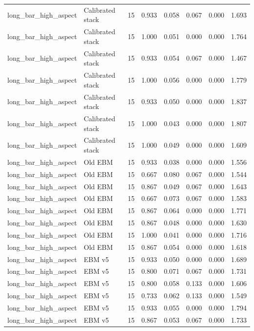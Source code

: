 {\begin{longtable}{llrrrrrr}
long\_bar\_high\_aspect & Calibrated stack & 15 & 0.933 & 0.058 & 0.067 & 0.000 & 1.693 \\
long\_bar\_high\_aspect & Calibrated stack & 15 & 1.000 & 0.051 & 0.000 & 0.000 & 1.764 \\
long\_bar\_high\_aspect & Calibrated stack & 15 & 0.933 & 0.054 & 0.067 & 0.000 & 1.467 \\
long\_bar\_high\_aspect & Calibrated stack & 15 & 1.000 & 0.056 & 0.000 & 0.000 & 1.779 \\
long\_bar\_high\_aspect & Calibrated stack & 15 & 0.933 & 0.050 & 0.000 & 0.000 & 1.837 \\
long\_bar\_high\_aspect & Calibrated stack & 15 & 1.000 & 0.043 & 0.000 & 0.000 & 1.807 \\
long\_bar\_high\_aspect & Calibrated stack & 15 & 1.000 & 0.049 & 0.000 & 0.000 & 1.609 \\
long\_bar\_high\_aspect & Old EBM & 15 & 0.933 & 0.038 & 0.000 & 0.000 & 1.556 \\
long\_bar\_high\_aspect & Old EBM & 15 & 0.667 & 0.080 & 0.067 & 0.000 & 1.544 \\
long\_bar\_high\_aspect & Old EBM & 15 & 0.867 & 0.049 & 0.067 & 0.000 & 1.643 \\
long\_bar\_high\_aspect & Old EBM & 15 & 0.667 & 0.073 & 0.067 & 0.000 & 1.583 \\
long\_bar\_high\_aspect & Old EBM & 15 & 0.867 & 0.064 & 0.000 & 0.000 & 1.771 \\
long\_bar\_high\_aspect & Old EBM & 15 & 0.867 & 0.048 & 0.000 & 0.000 & 1.630 \\
long\_bar\_high\_aspect & Old EBM & 15 & 1.000 & 0.041 & 0.000 & 0.000 & 1.716 \\
long\_bar\_high\_aspect & Old EBM & 15 & 0.867 & 0.054 & 0.000 & 0.000 & 1.618 \\
long\_bar\_high\_aspect & EBM v5 & 15 & 0.933 & 0.050 & 0.000 & 0.000 & 1.689 \\
long\_bar\_high\_aspect & EBM v5 & 15 & 0.800 & 0.071 & 0.067 & 0.000 & 1.731 \\
long\_bar\_high\_aspect & EBM v5 & 15 & 0.800 & 0.058 & 0.133 & 0.000 & 1.606 \\
long\_bar\_high\_aspect & EBM v5 & 15 & 0.733 & 0.062 & 0.133 & 0.000 & 1.549 \\
long\_bar\_high\_aspect & EBM v5 & 15 & 0.933 & 0.055 & 0.000 & 0.000 & 1.794 \\
long\_bar\_high\_aspect & EBM v5 & 15 & 0.867 & 0.053 & 0.067 & 0.000 & 1.733 \\

\end{longtable}}
